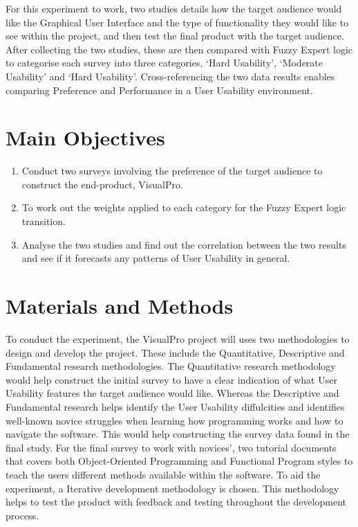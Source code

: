 \documentclass[a0,portrait]{a0poster}
\begin{document}
\begin{multicols}{2}
    For this experiment to work, two studies details how the target audience would like the Graphical User Interface and the type of functionality they would like to see within the project, and then test the final product with the target audience. After collecting the two studies, these are then compared with Fuzzy Expert logic to categorise each survey into three categories, `Hard Usability', `Moderate Usability' and `Hard Usability'. Cross-referencing the two data results enables comparing Preference and Performance in a User Usability environment. 


\color{DarkSlateGray} %

\section*{Main Objectives}

\begin{enumerate}
\item Conduct two surveys involving the preference of the target audience to construct the end-product, VisualPro.
\item To work out the weights applied to each category for the Fuzzy Expert logic transition.
\item Analyse the two studies and find out the correlation between the two results and see if it forecasts any patterns of User Usability in general.
\end{enumerate}


\section*{Materials and Methods}
To conduct the experiment, the VisualPro project will uses two methodologies to design and develop the project. These include the Quantitative, Descriptive and Fundamental research methodologies. The Quantitative research methodology would help construct the initial survey to have a clear indication of what User Usability features the target audience would like. Whereas the Descriptive and Fundamental research helps identify the User Usability diffulcities and identifies well-known novice struggles when learning how programming works and how to navigate the software. This would help constructing the survey data found in the final study. For the final survey to work with novices', two tutorial documents that covers both Object-Oriented Programming and Functional Program styles to teach the users different methods available within the software. To aid the experiment, a Iterative development methodology is chosen. This methodology helps to test the product with feedback and testing throughout the development process.


\end{multicols}
\end{document}
